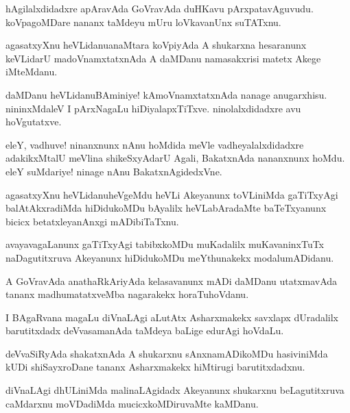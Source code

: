 \begin{mng}
hAgilalxdidadxre apAravAda GoVravAda duHKavu pArxpatavAguvudu. koVpagoMDare nananx taMdeyu mUru loVkavanUnx suTATxnu.
\end{mng}

\begin{mng}
agasatxyXnu heVLidanu\mdash anaMtara koVpiyAda A shukarxna hesaranunx keVLidarU madoVnamxtatxnAda A daMDanu namasakxrisi matetx Akege iMteMdanu.
\end{mng}

\begin{mng}
daMDanu heVLidanu\mdash BAminiye! kAmoVnamxtatxnAda nanage anugarxhisu. nininxMdaleV I pArxNagaLu hiDiyalapxTiTxve. ninolalxdidadxre avu hoVgutatxve.
\end{mng}

\begin{mng}
eleY, vadhuve! ninanxnunx nAnu hoMdida meVle vadheyalalxdidadxre adakikxMtalU meVlina shikeSxyAdarU Agali, BakatxnAda nananxnunx hoMdu. eleY suMdariye! ninage nAnu BakatxnAgidedxVne.
\end{mng}

\begin{mng}
agasatxyXnu heVLidanu\mdash heVgeMdu heVLi Akeyanunx toVLiniMda gaTiTxyAgi balAtAkxradiMda hiDidukoMDu bAyalilx heVLabAradaMte baTeTxyanunx bicicx betatxleyanAnxgi mADibiTaTxnu.
\end{mng}

\begin{mng}
avayavagaLanunx gaTiTxyAgi tabibxkoMDu muKadalilx muKavaninxTuTx naDagutitxruva Akeyanunx hiDidukoMDu meYthunakekx modalumADidanu.
\end{mng}

\begin{mng}
A GoVravAda anathaRkAriyAda kelasavanunx mADi daMDanu utatxmavAda tananx madhumatatxveMba nagarakekx horaTuhoVdanu.
\end{mng}

\begin{mng}
I BAgaRvana magaLu diVnaLAgi aLutAtx Asharxmakekx savxlapx dUradalilx barutitxdadx deVvasamanAda taMdeya baLige edurAgi hoVdaLu.
\end{mng}

\begin{mng}
deVvaSiRyAda shakatxnAda A shukarxnu sAnxnamADikoMDu hasiviniMda kUDi shiSayxroDane tananx Asharxmakekx hiMtirugi barutitxdadxnu.
\end{mng}

\begin{mng}
diVnaLAgi dhULiniMda malinaLAgidadx Akeyanunx shukarxnu beLagutitxruva caMdarxnu moVDadiMda mucicxkoMDiruvaMte kaMDanu.
\end{mng}

